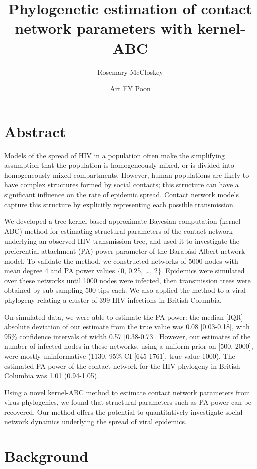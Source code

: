 \documentclass{article}
\title{Phylogenetic estimation of contact network parameters with kernel-ABC}
\author{Rosemary McCloskey \and Art FY Poon}
\begin{document}
\maketitle

\onehalfspacing

\section{Abstract}

Models of the spread of HIV in a population often make the simplifying
assumption that the population is homogeneously mixed, or is divided into
homogeneously mixed compartments. However, human populations are likely to have
complex structures formed by social contacts; this structure can have a
significant influence on the rate of epidemic spread. Contact network models
capture this structure by explicitly representing each possible transmission. 

We developed a tree kernel-based approximate Bayesian computation (kernel-ABC)
method for estimating structural parameters of the contact network underlying
an observed HIV transmission tree, and used it to investigate the preferential
attachment (PA) power parameter of the Barab\'asi-Albert network model. To
validate the method, we constructed networks of 5000 nodes with mean degree 4
and PA power values \{0, 0.25, \ldots, 2\}. Epidemics were simulated over these
networks until 1000 nodes were infected, then transmission trees were obtained
by sub-sampling 500 tips each. We also applied the method to a viral phylogeny
relating a cluster of 399 HIV infections in British Columbia.

On simulated data, we were able to estimate the PA power: the median [IQR]
absolute deviation of our estimate from the true value was 0.08 [0.03-0.18],
with 95\% confidence intervals of width 0.57 [0.38-0.73]. However, our estimates
of the number of infected nodes in these networks, using a uniform prior on
[500, 2000], were mostly uninformative (1130, 95\% CI [645-1761], true value
1000). The estimated PA power of the contact network for the HIV phylogeny in
British Columbia was 1.01 (0.94-1.05).

Using a novel kernel-ABC method to estimate contact network parameters from
virus phylogenies, we found that structural parameters such as PA power can be
recovered. Our method offers the potential to quantitatively investigate social
network dynamics underlying the spread of viral epidemics.


\section{Background}
\end{document}
